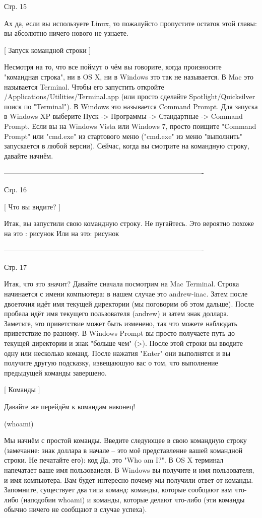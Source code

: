 Стр. 15

Ах да, если вы используете Linux, то пожалуйсто пропустите остаток этой главы: вы
абсолютно ничего нового не узнаете.

[ Запуск командной строки ]

Несмотря на то, что все поймут о чём вы говорите, когда произносите "командная 
строка", ни в OS X, ни в Windows это так не называется. В Mac это называется 
Terminal. Чтобы его запустить откройте /Applications/Utilities/Terminal.app (или 
просто сделайте Spotlight/Quicksilver поиск по "Terminal").
В Windows это называется Command Prompt. Для запуска в Windows XP выберите Пуск -> 
Программы -> Стандартные -> Command Prompt. Если вы на Windows Vista или Windows 7,
просто поищите "Command Prompt" или "cmd.exe" из стартового меню ("cmd.exe" из меню
"выполнить" запускается в любой версии).
Сейчас, когда вы смотрите на командную строку, давайте начнём.

-------------------------------------------------------------------------------------

Стр. 16

[ Что вы видите? ]

Итак, вы запустили свою командную строку. Не пугайтесь. Это вероятно похоже на это :
{рисунок}
Или на это:
{рисунок}

-------------------------------------------------------------------------------------

Стр. 17

Итак, что это значит? Давайте сначала посмотрим на Mac Terminal. Строка начинается с
имени компьютера: в нашем случае это andrew-inac. Затем после двоеточия идёт имя 
текущей директории (мы поговорим об этом дальше). После пробела идёт имя текущего
пользователя (andrew) и затем знак доллара. Заметьте, это приветствие может быть 
изменено, так что можете наблюдать приветствие по-разному.
В Windows Prompt вы просто получаете путь до текущей директории и знак "больше чем" (>).
После этой строки вы вводите одну или несколько команд. После нажатия "Enter" они 
выполнятся и вы получите другую подсказку, извещаюшую вас о том, что выполнение 
предыдущей команды завершено.

[ Команды ]

Давайте же перейдём к командам наконец!

(whoami)

Мы начнём с простой команды. Введите следующее в свою командную строку (замечание:
знак доллара в начале -- это моё представление вашей командной строки. Не печатайте
его):
{код}
Да, это "Who am I?". В OS X терминал напечатает ваше имя пользоваиеля. В Windows вы 
получите и имя пользователя, и имя компьютера.
Вам будет интересно почему мы получили ответ от команды. Запомните, существует два
типа команд: команды, которые сообщают вам что-либо (наподобии whoami) и команды,
которые делают что-либо (эти команды обычно ничего не сообщают в случае успеха).


